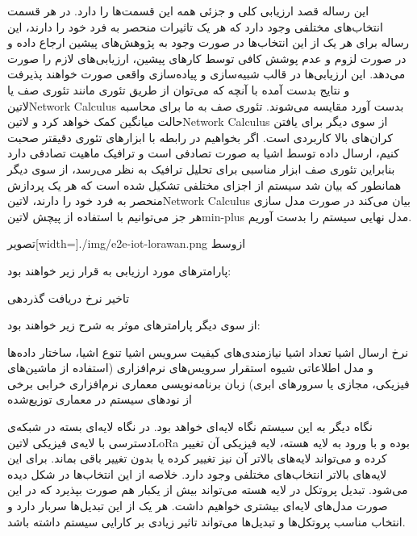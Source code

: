 این رساله قصد ارزیابی کلی و جزئی همه این قسمت‌ها را دارد. در هر قسمت انتخاب‌های مختلفی وجود دارد که هر یک تاثیرات منحصر به فرد خود را دارند،
این رساله برای هر یک از این انتخاب‌ها در صورت وجود به پژوهش‌های پیشین ارجاع داده و در صورت لزوم و عدم پوشش کافی توسط کارهای پیشین، ارزیابی‌های لازم را صورت می‌دهد.
این ارزیابی‌ها در قالب شبیه‌سازی و پیاده‌سازی واقعی صورت خواهند پذیرفت و نتایج بدست آمده با آنچه که می‌توان از طریق تئوری مانند تئوری صف یا ‌لاتین{Network Calculus}
بدست آورد مقایسه می‌شوند. تئوری صف به ما برای محاسبه حالت میانگین کمک خواهد کرد و ‌لاتین{Network Calculus} از سوی دیگر برای یافتن کران‌های بالا کاربردی است.
اگر بخواهیم در رابطه با ابزارهای تئوری دقیقتر صحبت کنیم، ارسال داده توسط اشیا به صورت تصادفی است و ترافیک ماهیت تصادفی دارد بنابراین تئوری صف ابزار مناسبی برای تحلیل ترافیک به نظر می‌رسد،
از سوی دیگر همانطور که بیان شد سیستم از اجزای مختلفی تشکیل شده است که هر یک پردازش منحصر به فرد خود را دارند، ‌لاتین{Network Calculus} بیان می‌کند در صورت مدل سازی هر جز
می‌توانیم با استفاده از پیچش ‌لاتین{min-plus} مدل نهایی سیستم را بدست آوریم.

‌تصویر[width=\textwidth]{./img/e2e-iot-lorawan.png}
‌ازوسط

پارامترهای مورد ارزیابی به قرار زیر خواهند بود:

 تاخیر
 نرخ دریافت
 گذردهی

از سوی دیگر پارامترهای موثر به شرح زیر خواهند بود:

 نرخ ارسال اشیا
 تعداد اشیا
 نیازمندی‌های کیفیت سرویس اشیا
 تنوع اشیا، ساختار داده‌ها و مدل اطلاعاتی
 شیوه استقرار سرویس‌های نرم‌افزاری (استفاده از ماشین‌های فیزیکی، مجازی یا سرورهای ابری)
 زبان برنامه‌نویسی
 معماری نرم‌افزاری
 خرابی برخی از نودهای سیستم در معماری توزیع‌شده

نگاه دیگر به این سیستم نگاه لایه‌ای خواهد بود. در نگاه لایه‌ای بسته در شبکه‌ی دسترسی با لایه‌ی فیزیکی ‌لاتین{LoRa} بوده و با ورود به لایه هسته،
لایه فیزیکی آن تغییر کرده و می‌تواند لایه‌های بالاتر آن نیز تغییر کرده یا بدون تغییر باقی بماند. برای این لایه‌های بالاتر انتخاب‌های مختلفی وجود دارد.
خلاصه از این انتخاب‌ها در شکل  دیده می‌شود.
تبدیل پروتکل در لایه هسته می‌تواند بیش از یکبار هم صورت بپذیرد که در این صورت مدل‌های لایه‌ای بیشتری خواهیم داشت. هر یک از این تبدیل‌ها
سربار دارد و انتخاب مناسب پروتکل‌ها و تبدیل‌ها می‌تواند تاثیر زیادی بر کارایی سیستم داشته باشد.


